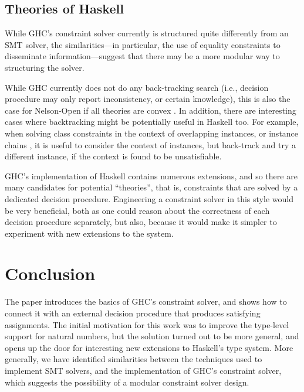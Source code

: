 \documentclass{sigplanconf}
\begin{document}
\subsection{Theories of Haskell}

While GHC's constraint solver currently is structured quite differently
from an SMT solver, the similarities---in particular, the use of equality
constraints to disseminate information---suggest that there may be
a more modular way to structuring the solver.

While GHC currently does not do any back-tracking search (i.e., decision
procedure may only report inconsistency, or certain knowledge), this
is also the case for Nelson-Open if all theories are convex \cite{NelsonOppen}.
In addition,
there are interesting cases where backtracking might be potentially useful
in Haskell too.  For example, when solving class constraints in the
context of overlapping instances, or instance chains \cite{instance-chains},
it is useful to consider the context of instances,
but back-track and try a different instance, if the context is found
to be unsatisfiable.

GHC's implementation of Haskell contains numerous extensions, and so
there are many candidates for potential ``theories'', that is, constraints
that are solved by a dedicated decision procedure.  Engineering a
constraint solver in this style would be very beneficial, both
as one could reason about the correctness of each decision procedure
separately, but also, because it would make it simpler to experiment
with new extensions to the system.

\section {Conclusion}

The paper introduces the basics of GHC's constraint solver, and shows
how to connect it with an external decision procedure that produces
satisfying assignments.  The initial motivation for this work was
to improve the type-level support for natural numbers, but the solution
turned out to be more general, and opens up the door for interesting
new extensions to Haskell's type system.  More generally, we have
identified similarities between the techniques used to implement SMT solvers,
and the implementation of GHC's constraint solver, which suggests
the possibility of a modular constraint solver design.











% 
% 
% 
% 
\end{document}
